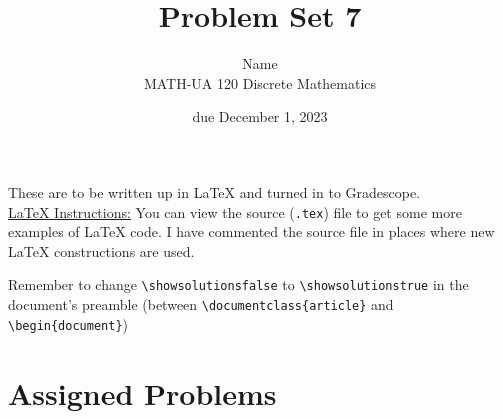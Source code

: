 \documentclass{article}
\title{Problem Set 7}
\author{%
    Name
\\  MATH-UA 120 Discrete Mathematics
}
\date{due December 1, 2023}
\newif\ifshowsolutions
\newcommand{\danger}{\marginpar[\hfill\dbend]{\dbend\hfill}}
\theoremstyle{definition}
\begin{document}
\maketitle



These are to be written up in \LaTeX{} and turned in to Gradescope.\\



\ifshowsolutions
    \SetupExSheets{solution/print=true}
\else
    \danger
 \underline{ \LaTeX{}  Instructions:}  You can view the source (\texttt{.tex}) file to get some more examples of \LaTeX{} code.  I have commented the source file in places where new \LaTeX{} constructions are used.
  
  Remember to change \verb|\showsolutionsfalse| to \verb|\showsolutionstrue|
    in the document's preamble 
    (between \verb|\documentclass{article}| and \verb|\begin{document}|)
\fi

\section*{Assigned Problems}
\end{document}

